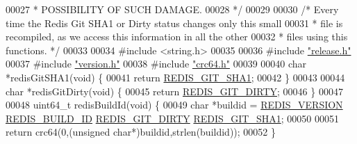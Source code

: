\begin{DoxyCode}
00027 \textcolor{comment}{ * POSSIBILITY OF SUCH DAMAGE.}
00028 \textcolor{comment}{ */}
00029 
00030 \textcolor{comment}{/* Every time the Redis Git SHA1 or Dirty status changes only this small}
00031 \textcolor{comment}{ * file is recompiled, as we access this information in all the other}
00032 \textcolor{comment}{ * files using this functions. */}
00033 
00034 \textcolor{preprocessor}{#}\textcolor{preprocessor}{include} \textcolor{preprocessor}{<}\textcolor{preprocessor}{string}\textcolor{preprocessor}{.}\textcolor{preprocessor}{h}\textcolor{preprocessor}{>}
00035 
00036 \textcolor{preprocessor}{#}\textcolor{preprocessor}{include} \hyperlink{release_8h}{"release.h"}
00037 \textcolor{preprocessor}{#}\textcolor{preprocessor}{include} \hyperlink{version_8h}{"version.h"}
00038 \textcolor{preprocessor}{#}\textcolor{preprocessor}{include} \hyperlink{crc64_8h}{"crc64.h"}
00039 
00040 \textcolor{keywordtype}{char} *redisGitSHA1(\textcolor{keywordtype}{void}) \{
00041     \textcolor{keywordflow}{return} \hyperlink{release_8h_a1b35aa9f60c274eb631ba59d6027bc3e}{REDIS\_GIT\_SHA1};
00042 \}
00043 
00044 \textcolor{keywordtype}{char} *redisGitDirty(\textcolor{keywordtype}{void}) \{
00045     \textcolor{keywordflow}{return} \hyperlink{release_8h_a9f898d3c5a239c0ad24abf94a7287e24}{REDIS\_GIT\_DIRTY};
00046 \}
00047 
00048 uint64\_t redisBuildId(\textcolor{keywordtype}{void}) \{
00049     \textcolor{keywordtype}{char} *buildid = \hyperlink{version_8h_a357a0d302ef7fbb42bf2db0632b9f7fe}{REDIS\_VERSION} \hyperlink{release_8h_abede7a2ad28571d363ca88b8e0eed55e}{REDIS\_BUILD\_ID} 
      \hyperlink{release_8h_a9f898d3c5a239c0ad24abf94a7287e24}{REDIS\_GIT\_DIRTY} \hyperlink{release_8h_a1b35aa9f60c274eb631ba59d6027bc3e}{REDIS\_GIT\_SHA1};
00050 
00051     \textcolor{keywordflow}{return} crc64(0,(\textcolor{keywordtype}{unsigned} \textcolor{keywordtype}{char}*)buildid,strlen(buildid));
00052 \}
\end{DoxyCode}
